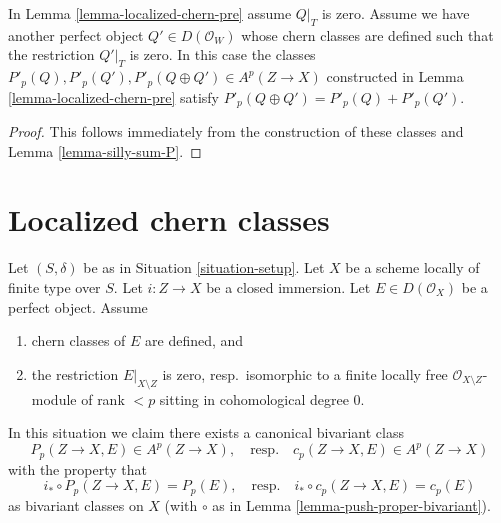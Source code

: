 \begin{lemma}
\label{lemma-localized-chern-pre-sum-P}
In Lemma \ref{lemma-localized-chern-pre} assume $Q|_T$ is zero.
Assume we have another perfect object $Q' \in D(\mathcal{O}_W)$
whose chern classes are defined such that the restriction $Q'|_T$ is zero.
In this case the classes
$P'_p(Q), P'_p(Q'), P'_p(Q \oplus Q') \in A^p(Z \to X)$
constructed in Lemma \ref{lemma-localized-chern-pre}
satisfy $P'_p(Q \oplus Q') = P'_p(Q) + P'_p(Q')$.
\end{lemma}

\begin{proof}
This follows immediately from the construction of these
classes and Lemma \ref{lemma-silly-sum-P}.
\end{proof}









 
\section{Localized chern classes}
\label{section-localized-chern}

\noindent
Let $(S, \delta)$ be as in Situation \ref{situation-setup}. Let $X$ be a scheme
locally of finite type over $S$. Let $i : Z \to X$ be a closed immersion.
Let $E \in D(\mathcal{O}_X)$ be a perfect object. Assume
\begin{enumerate}
\item chern classes of $E$ are defined, and
\item the restriction $E|_{X \setminus Z}$ is zero, resp.\ isomorphic to a
finite locally free $\mathcal{O}_{X \setminus Z}$-module of rank $< p$
sitting in cohomological degree $0$.
\end{enumerate}
In this situation we claim there exists a canonical bivariant class
$$
P_p(Z \to X, E) \in A^p(Z \to X),
\quad\text{resp.}\quad
c_p(Z \to X, E) \in A^p(Z \to X)
$$
with the property that
\begin{equation}
\label{equation-defining-property-localized-classes}
i_* \circ P_p(Z \to X, E) = P_p(E),
\quad\text{resp.}\quad
i_* \circ c_p(Z \to X, E) = c_p(E)
\end{equation}
as bivariant classes on $X$ (with $\circ$ as in
Lemma \ref{lemma-push-proper-bivariant}).

